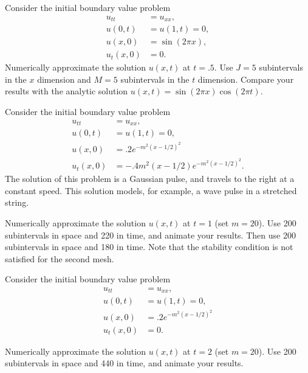 \begin{problem}
	Consider the initial boundary value problem 
	\begin{align*}
		u_{tt} &= u_{xx}, \\
		u(0,t) &= u(1,t) = 0, \\
		u(x,0) &= \sin(2 \pi x),\\ 
		u_t(x,0) &= 0.
	\end{align*}
	Numerically approximate the solution $u(x,t)$ at $t = .5$.  Use $J=5$ subintervals in the $x$ dimension and $M=5$ subintervals in the $t$ dimension. %
	 Compare your results with the analytic solution $u(x,t) = \sin{(2 \pi x)} \cos{(2 \pi t)}.$
\end{problem}



\begin{problem}
	Consider the initial boundary value problem 
	\begin{align*}
		u_{tt} &= u_{xx}, \\
		u(0,t) &= u(1,t) = 0, \\
		u(x,0) &= .2e^{-m^2(x-1/2)^2}\\ 
		u_t(x,0) &= -.4m^2(x-1/2)e^{-m^2(x-1/2)^2}.
	\end{align*}
	The solution of this problem is a Gaussian pulse, and travels to the right at a constant speed.  This solution models, for example, a wave pulse in a stretched string. 
	
	Numerically approximate the solution $u(x,t)$ at $t = 1$ (set $m=20$).  Use 200 subintervals in space and 220 in time, and animate your results.  Then use 200 subintervals in space and 180 in time. Note that the stability condition is not satisfied for the second mesh. 
\end{problem}


\begin{problem}
	Consider the initial boundary value problem 
	\begin{align*}
		u_{tt} &= u_{xx}, \\
		u(0,t) &= u(1,t) = 0, \\
		u(x,0) &= .2e^{-m^2(x-1/2)^2}\\ 
		u_t(x,0) &= 0.
	\end{align*}
	
	Numerically approximate the solution $u(x,t)$ at $t = 2$ (set $m=20$).  Use 200 subintervals in space and 440 in time, and animate your results.  
\end{problem}


